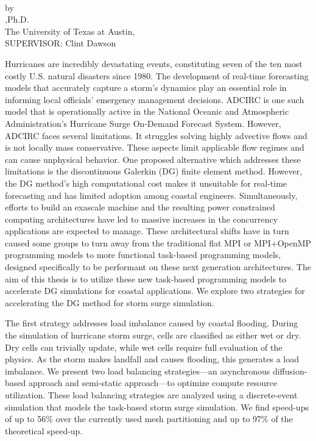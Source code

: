 \newpage
\thispagestyle{plain} 
\makeatletter
\begin{center}
\textbf{\large
\@title
}\\
\vspace{1cm}
by\\
\vspace{1cm}
\@author,\space Ph.D. \\
The University of Texas at Austin, \theyear \\
SUPERVISOR: Clint Dawson
\end{center}
\vspace{1cm}

\indent
    Hurricanes are incredibly devastating events, constituting seven of the ten most costly U.S. natural disasters since 1980. The development of real-time forecasting models that accurately capture a storm's dynamics play an essential role in informing local officials' emergency management decisions. 
    ADCIRC is one such model that is operationally active in the National Oceanic and Atmospheric Administration's Hurricane Surge On-Demand Forecast System. 
    However, ADCIRC faces several limitations. It struggles solving highly advective flows and is not locally mass conservative. These aspects limit applicable flow regimes and can cause unphysical behavior. One proposed alternative which addresses these limitations is the discontinuous Galerkin (DG) finite element method. However, the DG method's high computational cost makes it unsuitable for real-time forecasting and has limited adoption among coastal engineers. Simultaneously, efforts to build an exascale machine and the resulting power constrained computing architectures have led to massive increases in the concurrency applications are expected to manage. These architectural shifts have in turn caused some groups to turn away from the traditional flat MPI or MPI+OpenMP programming models to more functional task-based programming models, designed specifically to be performant on these next generation architectures. The aim of this thesis is to utilize these new task-based programming models to accelerate DG simulations for coastal applications. We explore two strategies for accelerating the DG method for storm surge simulation.

    The first strategy addresses load imbalance caused by coastal flooding. During the simulation of hurricane storm surge, cells are classified as either wet or dry. Dry cells can trivially update, while wet cells require full evaluation of the physics. As the storm makes landfall and causes flooding, this generates a load imbalance. We present two load balancing strategies---an asynchronous diffusion-based approach and semi-static approach---to optimize compute resource utilization. These load balancing strategies are analyzed using a discrete-event simulation that models the task-based storm surge simulation. We find speed-ups of up to 56\% over the currently used mesh partitioning and up to 97\% of the theoretical speed-up.

